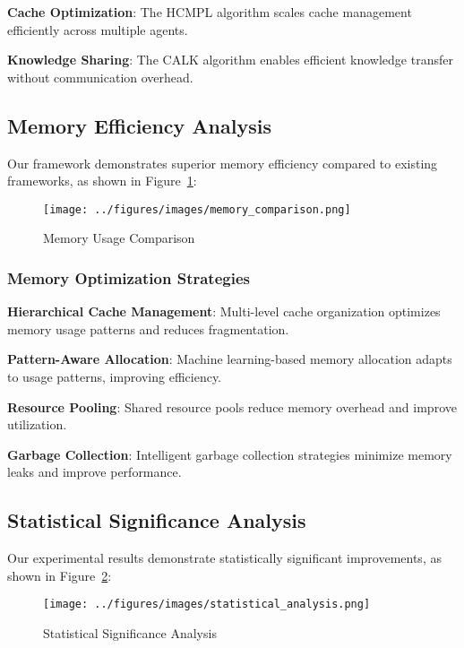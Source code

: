 \documentclass[conference]{IEEEtran}
\begin{document}
\textbf{Cache Optimization}: The HCMPL algorithm scales cache management efficiently across multiple agents.

\textbf{Knowledge Sharing}: The CALK algorithm enables efficient knowledge transfer without communication overhead.

\subsection{Memory Efficiency Analysis}

Our framework demonstrates superior memory efficiency compared to existing frameworks, as shown in Figure~\ref{fig:memory1}:

\begin{figure}[htbp]
\centering
\texttt{[image: ../figures/images/memory\_comparison.png]}
\caption{Memory Usage Comparison}
\label{fig:memory1}
\end{figure}

\subsubsection{Memory Optimization Strategies}

\textbf{Hierarchical Cache Management}: Multi-level cache organization optimizes memory usage patterns and reduces fragmentation.

\textbf{Pattern-Aware Allocation}: Machine learning-based memory allocation adapts to usage patterns, improving efficiency.

\textbf{Resource Pooling}: Shared resource pools reduce memory overhead and improve utilization.

\textbf{Garbage Collection}: Intelligent garbage collection strategies minimize memory leaks and improve performance.

\subsection{Statistical Significance Analysis}

Our experimental results demonstrate statistically significant improvements, as shown in Figure~\ref{fig:statistical}:

\begin{figure}[htbp]
\centering
\texttt{[image: ../figures/images/statistical\_analysis.png]}
\caption{Statistical Significance Analysis}
\label{fig:statistical}
\end{figure}
\end{document}
